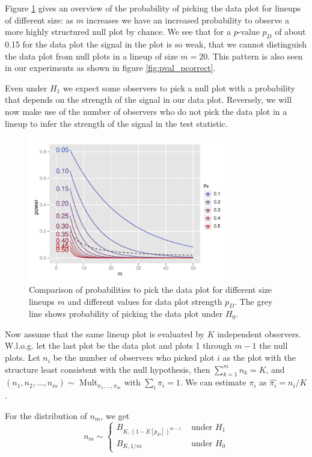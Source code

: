 \documentclass{article}
\begin{document}
Figure \ref{fig:pval_power} gives an overview of the probability of picking the data plot for lineups of different size: as $m$ increases we have an increased probability to observe a more highly structured null plot by chance. We see that for a $p$-value $p_D$ of about 0.15 for the data plot the signal in the plot is so weak, that we cannot distinguish the data plot from null plots in a lineup of size $m=20$. This pattern is also seen in our experiments as shown in figure \ref{fig:pval_pcorrect}.

Even under $H_1$ we expect some observers to pick a null plot with a probability that depends on the strength of the signal in our data plot. 
Reversely, we will now make use of the number of observers who do not pick the data plot in a lineup to infer the strength of the signal in the test statistic.

\begin{figure}[htbp] %
   \centering
   \includegraphics[width=3.5in]{images/p_val_power_m.pdf} 
   \caption{Comparison of probabilities to pick the data plot for different size lineups $m$ and different values for data plot strength $p_D$. The grey line shows probability of picking the data plot under $H_0$. }
   \label{fig:pval_power}
\end{figure}

Now assume that the same lineup plot is evaluated by $K$ independent observers. W.l.o.g. let the last plot be the data plot and plots 1 through $m-1$ the null plots. Let $n_i$ be the number of observers who picked plot $i$ as the plot with the structure least consistent with the null hypothesis, then $\sum_{k=1}^{m} n_k = K$, and $(n_1, n_2, ..., n_m) \sim$ Mult$_{\pi_1, ..., \pi_m}$ with $\sum_i \pi_i = 1$. We can estimate $\pi_i$ as $\widehat{\pi_i} = n_i/K$. 

For the distribution of $n_m$, %
we get
\[
n_m\sim \left \{ 
\begin{array}{ll}
B_{K, (1-E[p_D])^{m-1}} & \text { under } H_1\\
B_{K, 1/m} & \text { under } H_0
\end{array}
\right .
\]
\end{document}
